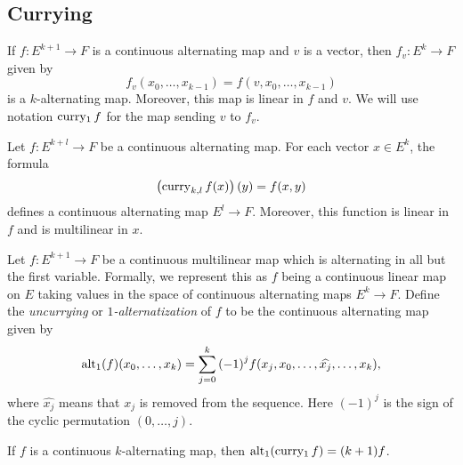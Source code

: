 
\subsection{Currying}%
\label{sec:currying}

\begin{definition}%
  \label{def:cont-alt-curry-fin}
  If \(f\colon E^{k + 1} \to F\) is a continuous alternating map and \(v\) is a vector,
  then \(f_{v}\colon E^{k} \to F\) given by
  \[
    f_{v}(x_{0}, \dots, x_{k - 1})=f(v, x_{0}, \dots, x_{k - 1})
  \]
  is a \(k\)-alternating map.
  Moreover, this map is linear in \(f\) and \(v\).
  We will use notation \(\operatorname{curry_1} f\) for the map sending \(v\) to \(f_{v}\).
\end{definition}

\begin{definition}%
  \label{def:cont-alt-curry-fin-add}
  Let \(f\colon E^{k + l} \to F\) be a continuous alternating map.
  For each vector \(x \in E^{k}\), the formula
  \[
    \left(\operatorname{curry}_{k,l} f(x)\right)(y) = f(x, y)
  \]
  defines a continuous alternating map \(E^{l}\to F\).
  Moreover, this function is linear in \(f\) and is multilinear in \(x\).
\end{definition}

\begin{definition}%
  \label{def:alt-one}
  Let \(f\colon E^{k + 1}\to F\) be a continuous multilinear map which is alternating in all but the first variable.
  Formally, we represent this as \(f\) being a continuous linear map on \(E\) taking values in the space of continuous alternating maps \(E^{k}\to F\).
  Define the \emph{uncurrying} or \emph{\(1\)-alternatization} of \(f\) to be the continuous alternating map given by
  \[
    \operatorname{alt_1}(f)(x_{0}, \dots, x_{k}) = \sum_{j=0}^{k}{(-1)}^{j}f(x_{j}, x_{0}, \dots, \widehat{x_{j}}, \dots, x_{k}),
  \]
  where \(\widehat{x_{j}}\) means that \(x_{j}\) is removed from the sequence.
  Here \({(-1)}^{j}\) is the sign of the cyclic permutation \((0, \dots, j)\).
\end{definition}

\begin{theorem}%
  \label{thm:uncurry-curry-one}
  If \(f\) is a continuous \(k\)-alternating map, then \(\operatorname{alt_1}(\operatorname{curry_1} f) = (k + 1)f\).
\end{theorem}

